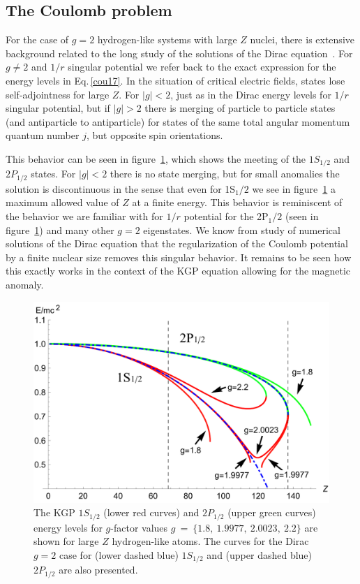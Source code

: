 \documentclass[epj]{svjour}
\begin{document}
\subsection{The Coulomb problem} \label{sbc}
For the case of $g=2$ hydrogen-like systems with large $Z$ nuclei, there is extensive background related to the long study of the solutions of the Dirac equation~\cite{Rafelski:1976ts,Greiner:1985ce,Rafelski:2016ixr}. For $g\ne 2$ and $1/r$ singular potential we refer back to the exact expression for the energy levels in Eq.\,\eqref{cou17}. In the situation of critical electric fields, states lose self-adjointness for large $Z$. For $|g|<2$, just as in the Dirac energy levels for $1/r$ singular potential, but if $|g|>2$ there is merging of particle to particle states (and antiparticle to antiparticle) for states of the same total angular momentum quantum number $j$, but opposite spin orientations.

This behavior can be seen in figure~\ref{f03}, which shows the meeting of the $1S_{1/2}$ and $2P_{1/2}$ states. For $|g|<2$ there is no state merging, but for small anomalies the solution is discontinuous in the sense that even for 1S$_1/2$ we see in figure~\ref{f03} a maximum allowed value of $Z$ at a finite energy. This behavior is reminiscent of the behavior we are familiar with for $1/r$ potential for the 2P$_1/2$ (seen in figure~\ref{f03}) and many other $g=2$ eigenstates. We know from study of numerical solutions of the Dirac equation that the regularization of the Coulomb potential by a finite nuclear size removes this singular behavior. It remains to be seen how this exactly works in the context of the KGP equation allowing for the magnetic anomaly.

\begin{figure}
 \centering
 \includegraphics[width=\linewidth]{lanplot08}
 \caption[]{The KGP $1S_{1/2}$ (lower red curves) and $2P_{1/2}$ (upper green curves) energy levels for $g$-factor values $g~=~\{1.8,\ 1.9977,\ 2.0023,\ 2.2\}$ are shown for large $Z$ hydrogen-like atoms. The curves for the Dirac $g=2$ case for (lower dashed blue) $1S_{1/2}$ and (upper dashed blue) $2P_{1/2}$ are also presented.}
 \label{f03}
\end{figure}
\end{document}
